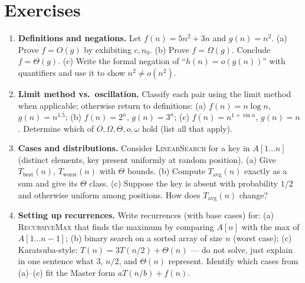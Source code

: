\section{Exercises}
\label{sec:ch02-exercises}
\begin{enumerate}[label=E2.\arabic*, leftmargin=*, itemsep=0.7em]
    \item \textbf{Definitions and negations.} Let $f(n)=5n^{2}+3n$ and $g(n)=n^{2}$. (a) Prove $f=O(g)$ by exhibiting $c,n_{0}$. (b) Prove $f=\Omega(g)$. Conclude $f=\Theta(g)$. (c) Write the formal negation of ``$h(n)=o(g(n))$'' with quantifiers and use it to show $n^{2}\neq o(n^{2})$.
    \item \textbf{Limit method vs.\ oscillation.} Classify each pair using the limit method when applicable; otherwise return to definitions: (a) $f(n)=n\log n$, $g(n)=n^{1.5}$; (b) $f(n)=2^{n}$, $g(n)=3^{n}$; (c) $f(n)=n^{1+\sin n}$, $g(n)=n$. Determine which of $O,\Omega,\Theta,o,\omega$ hold (list all that apply).
    \item \textbf{Cases and distributions.} Consider \textsc{LinearSearch} for a key in $A[1\ldots n]$ (distinct elements, key present uniformly at random position). (a) Give $T_{\text{best}}(n)$, $T_{\text{worst}}(n)$ with $\Theta$ bounds. (b) Compute $T_{\text{avg}}(n)$ exactly as a sum and give its $\Theta$ class. (c) Suppose the key is absent with probability $1/2$ and otherwise uniform among positions. How does $T_{\text{avg}}(n)$ change?
    \item \textbf{Setting up recurrences.} Write recurrences (with base cases) for: (a) \textsc{RecursiveMax} that finds the maximum by comparing $A[n]$ with the max of $A[1\ldots n-1]$; (b) binary search on a sorted array of size $n$ (worst case); (c) Karatsuba-style: $T(n)=3T(n/2)+\Theta(n)$ --- do not solve, just explain in one sentence what $3$, $n/2$, and $\Theta(n)$ represent. Identify which cases from (a)--(c) fit the Master form $aT(n/b)+f(n)$.
\end{enumerate}

